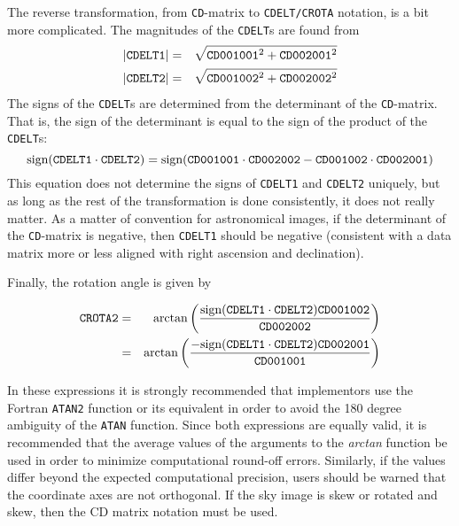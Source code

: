 The reverse transformation, from {\tt CD}-matrix to {\tt CDELT/CROTA} notation,
is a bit more complicated.  The magnitudes of the {\tt CDELT}s are found from
\begin{eqnarray*}
\left| {\tt CDELT1} \right| & = & \sqrt{ {\tt CD001001}^2 + {\tt CD002001}^2 } \\
\left| {\tt CDELT2} \right| & = & \sqrt{ {\tt CD001002}^2 + {\tt CD002002}^2 } \\
\end{eqnarray*}
The signs of the {\tt CDELT}s are determined from the determinant of the
{\tt CD}-matrix.  That is, the sign of the determinant is equal to the sign
of the product of the {\tt CDELT}s:
\begin{displaymath}
\hbox{sign}({\tt CDELT1} \cdot {\tt CDELT2}) = \hbox{sign}( {\tt CD001001}
\cdot {\tt CD002002} - {\tt CD001002} \cdot {\tt CD002001})
\end{displaymath}
This equation does not determine the signs of {\tt CDELT1} and {\tt CDELT2}
uniquely, but as long as the rest of the transformation is done consistently,
it does not really matter.  As a matter of convention for astronomical
images, if the determinant of the {\tt CD}-matrix is negative, then {\tt CDELT1}
should be negative (consistent with a data matrix more or less aligned with
right ascension and declination).

Finally, the rotation angle is given by

\begin{eqnarray*}
{\tt CROTA2} & = & \arctan \left( \frac{ \hbox{sign}({\tt CDELT1} \cdot
{\tt CDELT2}) {\tt CD001002}}{\tt CD002002} \right) \\
             & = & \arctan \left( \frac{ - \hbox{sign}({\tt CDELT1} \cdot
{\tt CDELT2}) {\tt CD002001}}{\tt CD001001} \right) \\
\end{eqnarray*}

In these expressions it is strongly recommended that implementors use the
Fortran {\tt ATAN2} function or its equivalent in order to avoid the 
180 degree ambiguity of the {\tt ATAN} function.
Since both expressions are equally valid, it is recommended that the average
values of the arguments to the {\it arctan} function be used in order to
minimize computational round-off errors.  Similarly, if the values differ
beyond the expected computational precision, users should be warned that
the coordinate axes are not orthogonal.  If the sky image is skew or rotated
and skew, then the CD matrix notation must be used. 

